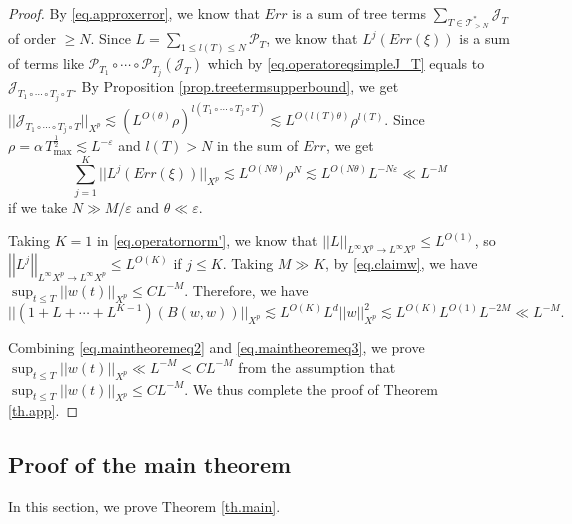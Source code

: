 \begin{proof}
By \eqref{eq.approxerror}, we know that $Err$ is a sum of tree terms $\sum_{T\in \mathcal{T}_{>N}^*} \mathcal{J}_T$ of order $\ge N$. Since $L=\sum_{1\le l(T)\le N} \mathcal{P}_{T}$, we know that $L^j(Err(\xi))$ is a sum of terms like $\mathcal{P}_{T_1}\circ\cdots\circ\mathcal{P}_{T_{j}}(\mathcal{J}_T)$ which by \eqref{eq.operatoreqsimpleJ_T} equals to $\mathcal{J}_{T_1\circ\cdots\circ T_{j}\circ T}$. By Proposition \ref{prop.treetermsupperbound}, we get $||\mathcal{J}_{T_1\circ\cdots\circ T_{j}\circ T}||_{X^p}\lesssim (L^{O(\theta)} \rho)^{l(T_1\circ\cdots\circ T_{j}\circ T)}\lesssim L^{O(l(T)\theta)} \rho^{l(T)}$. Since $\rho=\alpha\, T^{\frac{1}{2}}_{\text{max}}\lesssim L^{-\varepsilon}$ and $l(T)>N$ in the sum of $Err$, we get 
\begin{equation}\label{eq.maintheoremeq2}
    \sum_{j=1}^K||L^j(Err(\xi))||_{X^p}\lesssim L^{O(N\theta)} \rho^{N}\lesssim L^{O(N\theta)} L^{-N\varepsilon}\ll L^{-M}
\end{equation}
if we take $N\gg M/\varepsilon$ and $\theta\ll \varepsilon$.

Taking $K=1$ in \eqref{eq.operatornorm'}, we know that $\left|\left|L\right|\right|_{L^{\infty}X^p\rightarrow L^{\infty}X^p}\le L^{O(1)}$, so $\left|\left|L^j\right|\right|_{L^{\infty}X^p\rightarrow L^{\infty}X^p}\le L^{O(K)}$ if $j\le K$. Taking $M\gg K$, by \eqref{eq.claimw}, we have $\sup _{t\le T}||w(t)||_{X^p}\le CL^{-M}$. Therefore, we have 
\begin{equation}\label{eq.maintheoremeq3}
    ||(1+L+\cdots+L^{K-1})(B(w,w))||_{X^p}\lesssim L^{O(K)} L^d ||w||^2_{X^p}\lesssim L^{O(K)} L^{O(1)} L^{-2M}\ll L^{-M}.
\end{equation}

Combining \eqref{eq.maintheoremeq2} and \eqref{eq.maintheoremeq3}, we prove $\sup _{t\le T}||w(t)||_{X^p}\ll L^{-M} < CL^{-M}$ from the assumption that $\sup _{t\le T}||w(t)||_{X^p}\le CL^{-M}$. We thus complete the proof of Theorem \ref{th.app}.
\end{proof}


\subsection{Proof of the main theorem}\label{sec.proofmain} In this section, we prove Theorem \ref{th.main}.

